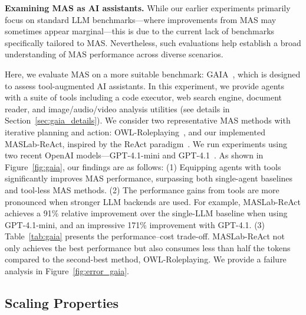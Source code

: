 \documentclass{article}
\begin{document}
\textbf{Examining MAS as AI assistants.}
While our earlier experiments primarily focus on standard LLM benchmarks—where improvements from MAS may sometimes appear marginal—this is due to the current lack of benchmarks specifically tailored to MAS.
Nevertheless, such evaluations help establish a broad understanding of MAS performance across diverse scenarios.

Here, we evaluate MAS on a more suitable benchmark: GAIA~\cite{mialon2024gaia}, which is designed to assess tool-augmented AI assistants.
In this experiment, we provide agents with a suite of tools including a code executor, web search engine, document reader, and image/audio/video analysis utilities (see details in Section~\ref{sec:gaia_details}).
We consider two representative MAS methods with iterative planning and action: OWL-Roleplaying~\cite{owl2025}, and our implemented MASLab-ReAct, inspired by the ReAct paradigm~\cite{react}.
We run experiments using two recent OpenAI models—GPT-4.1-mini and GPT-4.1~\cite{gpt-4.1}.
As shown in Figure~\ref{fig:gaia}, our findings are as follows:
(1) Equipping agents with tools significantly improves MAS performance, surpassing both single-agent baselines and tool-less MAS methods.
(2) The performance gains from tools are more pronounced when stronger LLM backends are used. 
For example, MASLab-ReAct achieves a 91\% relative improvement over the single-LLM baseline when using GPT-4.1-mini, and an impressive 171\% improvement with GPT-4.1.
(3) Table~\ref{tab:gaia} presents the performance–cost trade-off. MASLab-ReAct not only achieves the best performance but also consumes less than half the tokens compared to the second-best method, OWL-Roleplaying.
We provide a failure analysis in Figure~\ref{fig:error_gaia}.

\subsection{Scaling Properties}
\end{document}
